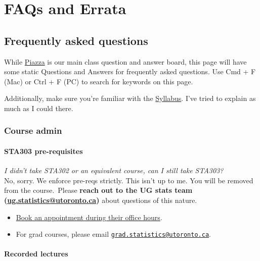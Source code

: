 \documentclass[
]{book}
\begin{document}
\hypertarget{faqs-and-errata}{%
\chapter{FAQs and Errata}\label{faqs-and-errata}}

\hypertarget{frequently-asked-questions}{%
\section{Frequently asked questions}\label{frequently-asked-questions}}

While \href{\%60r\%20piazza\%60}{Piazza} is our main class question and answer board, this page will have some static Questions and Answers for frequently asked questions. Use Cmd + F (Mac) or Ctrl + F (PC) to search for keywords on this page.

Additionally, make sure you're familiar with the \protect\hyperlink{syllabus}{Syllabus}. I've tried to explain as much as I could there.

\hypertarget{course-admin}{%
\subsection{Course admin}\label{course-admin}}

\hypertarget{prereq-faq}{%
\subsubsection{STA303 pre-requisites}\label{prereq-faq}}

\emph{I didn't take STA302 or an equivalent course, can I still take STA303?}\\
No, sorry. We enforce pre-reqs strictly. This isn't up to me. You will be removed from the course.~Please \textbf{reach out to the UG stats team (\url{ug.statistics@utoronto.ca})} about questions of this nature.

\begin{itemize}
\item
  \href{https://outlook.office365.com/owa/calendar/DepartmentofStatisticalSciencesUndergraduate@utoronto.onmicrosoft.com/bookings/}{Book an appointment during their office hours}.
\item
  For grad courses, please email \href{mailto:grad.statistics@utoronto.ca}{\nolinkurl{grad.statistics@utoronto.ca}}.
\end{itemize}

\hypertarget{recorded-lectures}{%
\subsubsection{Recorded lectures}\label{recorded-lectures}}
\end{document}
